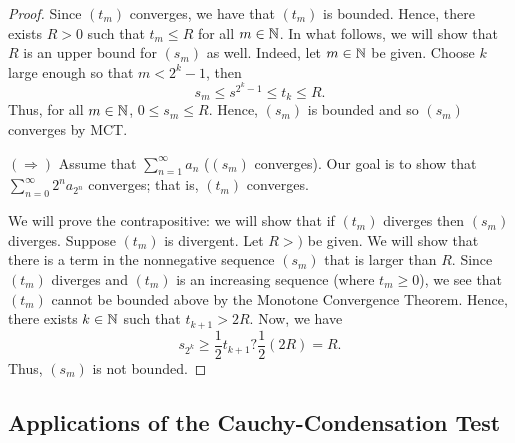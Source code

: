 \documentclass[a4paper]{article}
\begin{document}
\begin{proof}
Since \( ({t}_{m}) \) converges, we have that \( ({t}_{m}) \) is bounded. Hence, there exists \( R > 0  \) such that \( {t}_{m} \leq R  \) for all \( m \in \mathbb{N} \). In what follows, we will show that \( R  \) is an upper bound for \( ({s}_{m}) \) as well. Indeed, let \( m \in \mathbb{N}  \) be given. Choose \( k  \) large enough so that \( m < 2^{k } - 1  \), then 
\[  {s}_{m} \leq s^{2^{k} - 1} \leq {t}_{k} \leq R.  \]
Thus, for all \( m \in \mathbb{N}  \), \( 0 \leq {s}_{m} \leq R  \). Hence, \( ({s}_{m}) \) is bounded and so \( ({s}_{m})  \) converges by MCT.

\( (\Longrightarrow) \) Assume that \( \sum_{ n=1  }^{ \infty  } {a}_{n} \) (\( ({s}_{m}) \) converges). Our goal is to show that \( \sum_{ n=0 }^{ \infty   } 2^{n} {a}_{2^{n}} \) converges; that is, \( ({t}_{m}) \) converges.

We will prove the contrapositive: we will show that if \( ({t}_{m}) \) diverges then \( ({s}_{m}) \) diverges. Suppose \( ({t}_{m}) \) is divergent. Let \( R > )  \) be given. We will show that there is a term in the nonnegative sequence \( ({s}_{m}) \) that is larger than \( R  \). Since \( ({t}_{m}) \) diverges and \( ({t}_{m}) \) is an increasing sequence (where \( {t}_{m} \geq 0  \)), we see that \( ({t}_{m}) \) cannot be bounded above by the Monotone Convergence Theorem. Hence, there exists \( k \in \mathbb{N}  \) such that \( {t}_{k+1} > 2R \). Now, we have  
\[  {s}_{2^{k}} \geq \frac{ 1 }{ 2 }  {t}_{k+1} ? \frac{ 1 }{ 2 }  (2R) = R. \]
Thus, \( ({s}_{m}) \) is not bounded.
\end{proof}

\subsection{Applications of the Cauchy-Condensation Test}
\end{document}
